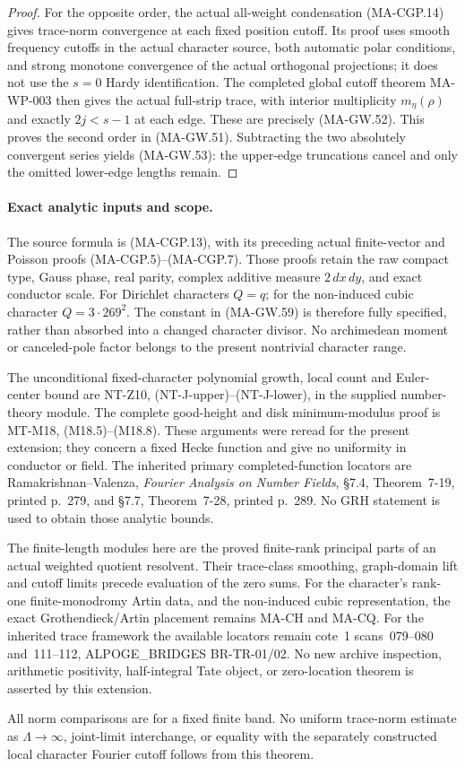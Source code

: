 \begin{proof}
For the opposite order, the actual all-weight condensation
(MA-CGP.14) gives trace-norm convergence at each fixed
position cutoff.  Its proof uses smooth frequency cutoffs
in the actual character source, both automatic polar
conditions, and strong monotone convergence of the actual
orthogonal projections; it does not use the \(s=0\)
Hardy identification.
The completed global cutoff theorem MA-WP-003 then gives
the actual full-strip trace, with interior multiplicity
\(m_\eta(\rho)\) and exactly \(2j<s-1\) at each edge.
These are precisely (MA-GW.52).
This proves the second order in (MA-GW.51).
Subtracting the two absolutely convergent series yields
(MA-GW.53): the upper-edge truncations cancel and only
the omitted lower-edge lengths remain.
\end{proof}

\paragraph{Exact analytic inputs and scope.}
The source formula is (MA-CGP.13), with its preceding
actual finite-vector and Poisson proofs (MA-CGP.5)--(MA-CGP.7).
Those proofs retain the raw compact type, Gauss phase,
real parity, complex additive measure \(2\,dx\,dy\),
and exact conductor scale.
For Dirichlet characters \(Q=q\); for the non-induced
cubic character \(Q=3\cdot269^2\).
The constant in (MA-GW.59) is therefore fully specified,
rather than absorbed into a changed character divisor.
No archimedean moment or canceled-pole factor belongs
to the present nontrivial character range.

The unconditional fixed-character polynomial growth,
local count and Euler-center bound are NT-Z10,
(NT-J-upper)--(NT-J-lower), in the supplied number-theory
module.  The complete good-height and disk minimum-modulus
proof is MT-M18, (M18.5)--(M18.8).
These arguments were reread for the present extension;
they concern a fixed Hecke function and give no uniformity
in conductor or field.
The inherited primary completed-function locators are
Ramakrishnan--Valenza, \emph{Fourier Analysis on Number Fields},
\S7.4, Theorem~7-19, printed p.~279, and \S7.7,
Theorem~7-28, printed p.~289.
No GRH statement is used to obtain those analytic bounds.

The finite-length modules here are the proved finite-rank
principal parts of an actual weighted quotient resolvent.
Their trace-class smoothing, graph-domain lift and cutoff
limits precede evaluation of the zero sums.
For the character's rank-one finite-monodromy Artin data,
and the non-induced cubic representation, the exact
Grothendieck/Artin placement remains MA-CH and MA-CQ.
For the inherited trace framework the available locators
remain cote~1 scans~079--080 and~111--112,
ALPOGE\_BRIDGES BR-TR-01/02.
No new archive inspection, arithmetic positivity,
half-integral Tate object, or zero-location theorem is
asserted by this extension.

All norm comparisons are for a fixed finite band.
No uniform trace-norm estimate as \(\Lambda\to\infty\),
joint-limit interchange, or equality with the separately
constructed local character Fourier cutoff follows from
this theorem.
